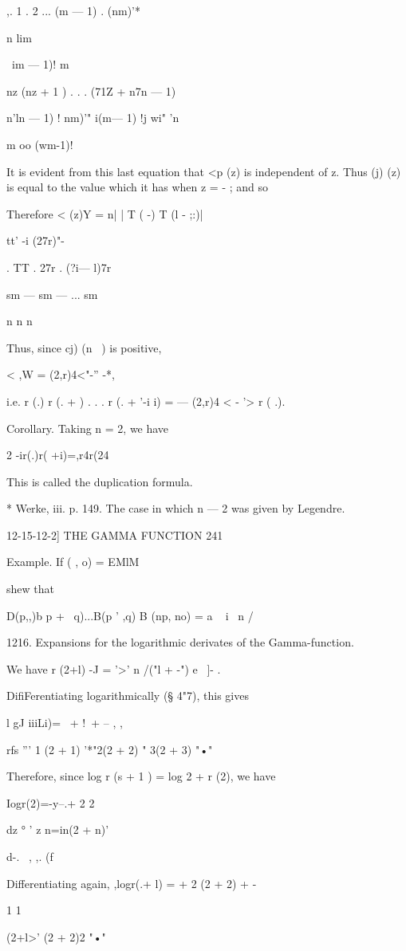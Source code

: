 ,. 1 . 2 ... (m — 1) . (nm)'*

n lim

\ im — 1)! m

nz (nz + 1 ) . . . (71Z + n7n — 1)

 n'ln — 1) ! nm)'" i(m— 1) !j wi" 'n

m oo (wm-1)!

It is evident from this last equation that <p (z) is independent of z.
Thus (j) (z) is equal to the value which it has when z = - ; and so

Therefore < (z)Y = n| | T ( -) T (l - ;:)|

tt' -i (27r)"-

. TT . 27r . (?i— l)7r

sm — sm — ... sm

n n n

Thus, since cj) (n~ ) is positive,

< ,W = (2,r)4<"-'' -*,

i.e. r (.) r (. + ) . . . r (. + '-i i) = — (2,r)4 < - '> r ( .).

Corollary. Taking n = 2, we have

2 -ir(.)r( +i)=,r4r(24

This is called the duplication formula.

* Werke, iii. p. 149. The case in which n — 2 was given by Legendre.

12-15-12-2] THE GAMMA FUNCTION 241

Example. If ( , o) = EMlM

shew that

D(p,,)b p + \ q)...B(p ' ,q) B (np, no) = a ~ i \ n /

1216. Expansions for the logarithmic derivates of the Gamma-function.

We have r (2+l) -J = '>' n /("l + -") e~ ]- .

DifiFerentiating logarithmically (§ 4"7), this gives

l gJ iiiLi)= \ + !\ + -- , ,

rfs ''' 1 (2 + 1) '*"2(2 + 2) " 3(2 + 3) "•"

Therefore, since log r (s + 1 ) = log 2 + r (2), we have

Iogr(2)=-y--.+ 2 2

dz ° ' z n=in(2 + n)'

d-. \ , ,. (f

Differentiating again, ,logr(.+ l) = + 2 (2 + 2) + -

1 1

 (2+l>' (2 + 2)2 "•"

